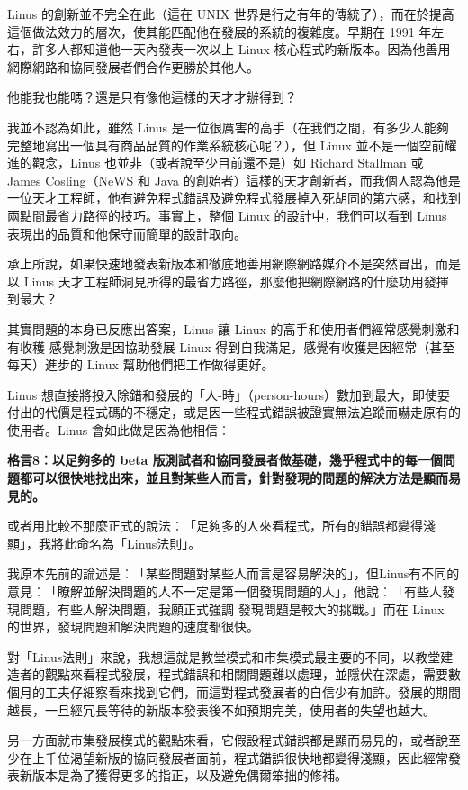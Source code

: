 \documentclass[12pt,]{article}
\makeatletter
\newcommand*{\shifttext}[2]{%
  \settowidth{\@tempdima}{#2}%
  \makebox[\@tempdima]{\hspace*{#1}#2}%
}
\makeatother
\begin{document}
Linus 的創新並不完全在此（這在 UNIX
世界是行之有年的傳統了），而在於提高這個做法效力的層次，使其能匹配他在發展的系統的複雜度。早期在
1991 年左右，許多人都知道他一天內發表一次以上 Linux
核心程式旳新版本。因為他善用網際網路和協同發展者們合作更勝於其他人。

他能我也能嗎？還是只有像他這樣的天才才辦得到？

我並不認為如此，雖然 Linus
是一位很厲害的高手（在我們之間，有多少人能夠完整地寫出一個具有商品品質的作業系統核心呢？），但
Linux 並不是一個空前耀進的觀念，Linus 也並非（或者說至少目前還不是）如
Richard Stallman 或 James Cosling（NeWS 和 Java
的創始者）這樣的天才創新者，而我個人認為他是一位天才工程師，他有避免程式錯誤及避免程式發展掉入死胡同的第六感，和找到兩點間最省力路徑的技巧。事實上，整個
Linux 的設計中，我們可以看到 Linus 表現出的品質和他保守而簡單的設計取向。

承上所說，如果快速地發表新版本和徹底地善用網際網路媒介不是突然冒出，而是以
Linus
天才工程師洞見所得的最省力路徑，那麼他把網際網路的什麼功用發揮到最大？

其實問題的本身已反應出答案，Linus 讓 Linux
的高手和使用者們經常感覺刺激和有收穫 \shifttext{1pt}{---}\shifttext{-1pt}{---} 感覺刺激是因協助發展 Linux
得到自我滿足，感覺有收獲是因經常（甚至每天）進步的 Linux
幫助他們把工作做得更好。

Linus
想直接將投入除錯和發展的「人-時」（person-hours）數加到最大，即使要付出的代價是程式碼的不穩定，或是因一些程式錯誤被證實無法追蹤而嚇走原有的使用者。Linus
會如此做是因為他相信︰

\textbf{格言8︰以足夠多的 beta
版測試者和協同發展者做基礎，幾乎程式中的每一個問題都可以很快地找出來，並且對某些人而言，針對發現的問題的解決方法是顯而易見的。}

或者用比較不那麼正式的說法︰「足夠多的人來看程式，所有的錯誤都變得淺顯」，我將此命名為「Linus法則」。

我原本先前的論述是︰「某些問題對某些人而言是容易解決的」，但Linus有不同的意見︰「瞭解並解決問題的人不一定是第一個發現問題的人」，他說︰「有些人發現問題，有些人解決問題，我願正式強調
\shifttext{1pt}{---}\shifttext{-1pt}{---} 發現問題是較大的挑戰。」而在 Linux
的世界，發現問題和解決問題的速度都很快。

對「Linus法則」來說，我想這就是教堂模式和市集模式最主要的不同，以教堂建造者的觀點來看程式發展，程式錯誤和相關問題難以處理，並隱伏在深處，需要數個月的工夫仔細察看來找到它們，而這對程式發展者的自信少有加許。發展的期間越長，一旦經冗長等待的新版本發表後不如預期完美，使用者的失望也越大。

另一方面就市集發展模式的觀點來看，它假設程式錯誤都是顯而易見的，或者說至少在上千位渴望新版的協同發展者面前，程式錯誤很快地都變得淺顯，因此經常發表新版本是為了獲得更多的指正，以及避免偶爾笨拙的修補。
\end{document}
